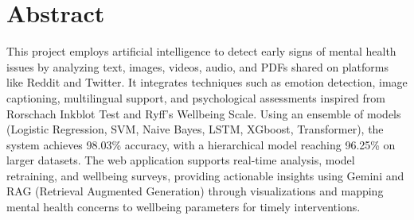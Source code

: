 

\section*{Abstract} 




\noindent
This project employs artificial intelligence to detect early signs of mental health issues by analyzing text, images, videos, audio, and PDFs shared on platforms like Reddit and Twitter. It integrates techniques such as emotion detection, image captioning, multilingual support, and psychological assessments inspired from Rorschach Inkblot Test and Ryff's Wellbeing Scale. Using an ensemble of models (Logistic Regression, SVM, Naive Bayes, LSTM, XGboost, Transformer), the system achieves 98.03\% accuracy, with a hierarchical model reaching 96.25\% on larger datasets. The web application supports real-time analysis, model retraining, and wellbeing surveys, providing actionable insights using Gemini and RAG (Retrieval Augmented Generation) through visualizations and mapping mental health concerns to wellbeing parameters for timely interventions.



\newpage